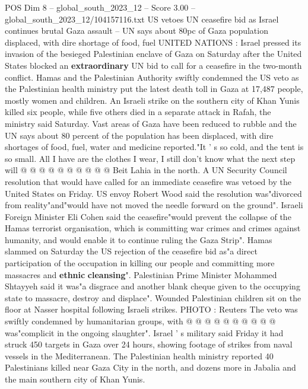 \begin{textsample}{POS Dim 8 – global\_south\_2023\_12 – Score 3.00 – global\_south\_2023\_12/104157116.txt}  \label{ex:f8_pos_435}
US vetoes UN ceasefire bid as Israel continues brutal Gaza assault -- UN says about 80pc of Gaza population displaced, with dire shortage of food, fuel UNITED NATIONS : Israel pressed its invasion of the besieged Palestinian enclave of Gaza on Saturday after the United States blocked an \textbf{extraordinary} UN bid to call for a ceasefire in the two-month conflict.
Hamas and the Palestinian Authority swiftly condemned the US veto as the Palestinian health ministry put the latest death toll in Gaza at 17,487 people, mostly women and children.
An Israeli strike on the southern city of Khan Yunis killed six people, while five others died in a separate attack in Rafah, the ministry said Saturday.
Vast areas of Gaza have been reduced to rubble and the UN says about 80 percent of the population has been displaced, with dire shortages of food, fuel, water and medicine reported."It ' s so cold, and the tent is so small.
All I have are the clothes I wear, I still don't know what the next step will @ @ @ @ @ @ @ @ @ @ Beit Lahia in the north.
A UN Security Council resolution that would have called for an immediate ceasefire was vetoed by the United States on Friday.
US envoy Robert Wood said the resolution was"divorced from reality"and"would have not moved the needle forward on the ground".
Israeli Foreign Minister Eli Cohen said the ceasefire"would prevent the collapse of the Hamas terrorist organisation, which is committing war crimes and crimes against humanity, and would enable it to continue ruling the Gaza Strip".
Hamas slammed on Saturday the US rejection of the ceasefire bid as"a direct participation of the occupation in killing our people and committing more massacres and \textbf{ethnic} \textbf{cleansing}".
Palestinian Prime Minister Mohammed Shtayyeh said it was"a disgrace and another blank cheque given to the occupying state to massacre, destroy and displace".
Wounded Palestinian children sit on the floor at Nasser hospital following Israeli strikes.
PHOTO : Reuters The veto was swiftly condemned by humanitarian groups, with @ @ @ @ @ @ @ @ @ @ was"complicit in the ongoing slaughter".
Israel ' s military said Friday it had struck 450 targets in Gaza over 24 hours, showing footage of strikes from naval vessels in the Mediterranean.
The Palestinian health ministry reported 40 Palestinians killed near Gaza City in the north, and dozens more in Jabalia and the main southern city of Khan Yunis.

\end{textsample}
